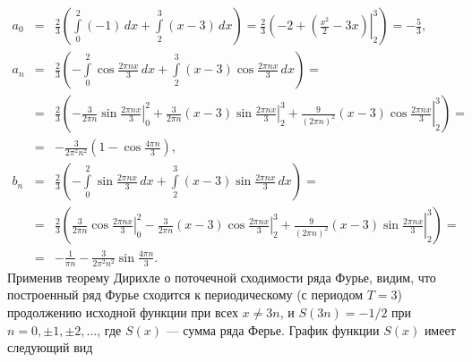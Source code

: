 $$
\begin{array}{rcl}
a_0 &=& \displaystyle\frac{2}{3}\left.\left(
\int\limits_0^2
(-1)\,dx + \int\limits_2^3
(x-3)\,dx \right) = 
\frac{2}{3}\left(
-2 + \left( \frac{x^2}{2}-3x\right)
\right|_2^3 \right) = -\frac{5}{3},												\\[12pt]
a_n &=& \displaystyle\frac{2}{3}\left(
	-\int\limits_0^2
	\cos \frac{2\pi nx}{3}\,dx + \int\limits_2^3
	(x-3)\cos \frac{2\pi nx}{3}\,dx \right) ={}									\\[12pt]
	&=& \displaystyle\frac{2}{3}\left(
	-\left.\frac{3}{2\pi n}\sin\frac{2\pi nx}{3} \right|_0^2
	+\left.\frac{3}{2\pi n}(x-3)\sin\frac{2\pi nx}{3} \right|_2^3 
	+\left.\frac{9}{(2\pi n)^2}(x-3)\cos\frac{2\pi nx}{3} \right|_2^3\right) = 	\\[12pt]
	&=& \displaystyle-\frac{3}{2\pi^2 n^2}\left(1-\cos\frac{4\pi n}{3} \right),	\\[12pt]
b_n &=& \displaystyle\frac{2}{3}\left(
	-\int\limits_0^2
	\sin \frac{2\pi nx}{3}\,dx + \int\limits_2^3
	(x-3)\sin \frac{2\pi nx}{3}\,dx \right) ={}									\\[12pt]
	&=& \displaystyle\frac{2}{3}\left(
	\left.\frac{3}{2\pi n}\cos\frac{2\pi nx}{3} \right|_0^2
	-\left.\frac{3}{2\pi n}(x-3)\cos\frac{2\pi nx}{3} \right|_2^3 
	+\left.\frac{9}{(2\pi n)^2}(x-3)\sin\frac{2\pi nx}{3} \right|_2^3\right) =	\\[12pt]
	&=& \displaystyle-\frac{1}{\pi n}-\frac{3}{2\pi^2 n^2}\sin\frac{4\pi n}{3}.
\end{array}
$$
Применив теорему Дирихле о поточечной сходимости ряда Фурье, видим, что построенный ряд Фурье сходится 
к периодическому (с периодом $T=3$) продолжению исходной функции при всех $x\ne 3n$, и 
$S(3n)=-1/2$ при $n=0,\pm1,\pm2,\ldots$, где $S(x)$ --- сумма ряда Ферье. 
График функции $S(x)$ имеет следующий вид
